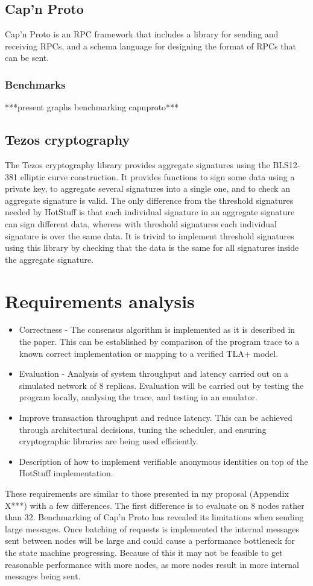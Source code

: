 \subsection{Cap'n Proto}
Cap'n Proto is an RPC framework that includes a library for sending and receiving RPCs, and a schema language for designing the format of RPCs that can be sent. 

\subsubsection{Benchmarks}
***present graphs benchmarking capnproto***

\subsection{Tezos cryptography}
The Tezos cryptography library provides aggregate signatures using the BLS12-381 elliptic curve construction. It provides functions to sign some data using a private key, to aggregate several signatures into a single one, and to check an aggregate signature is valid. The only difference from the threshold signatures needed by HotStuff is that each individual signature in an aggregate signature can sign different data, whereas with threshold signatures each individual signature is over the same data. It is trivial to implement threshold signatures using this library by checking that the data is the same for all signatures inside the aggregate signature.

\section{Requirements analysis}
\begin{itemize}
	\item Correctness - The consensus algorithm is implemented as it is described in the paper. This can be established by comparison of the program trace to a known correct implementation or mapping to a verified TLA+ model.
	\item Evaluation - Analysis of system throughput and latency carried out on a simulated network of 8 replicas. Evaluation will be carried out by testing the program locally, analysing the trace, and testing in an emulator.
	\item Improve transaction throughput and reduce latency. This can be achieved through architectural decisions, tuning the scheduler, and ensuring cryptographic libraries are being used efficiently.
	\item Description of how to implement verifiable anonymous identities on top of the HotStuff implementation.
\end{itemize}
These requirements are similar to those presented in my proposal (Appendix X***) with a few differences. The first difference is to evaluate on 8 nodes rather than 32. Benchmarking of Cap'n Proto has revealed its limitations when sending large messages. Once batching of requests is implemented the internal messages sent between nodes will be large and could cause a performance bottleneck for the state machine progressing. Because of this it may not be feasible to get reasonable performance with more nodes, as more nodes result in more internal messages being sent.


